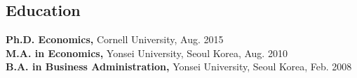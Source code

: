 \documentclass[margin]{res}
\begin{document}
\begin{resume}
\section{Education} 
\textbf{Ph.D. Economics,} Cornell University, Aug. 2015\\
\textbf{M.A. in Economics,} Yonsei University, Seoul Korea,  Aug. 2010\\
\textbf{B.A. in Business Administration,} Yonsei University, Seoul Korea, Feb. 2008
%

\end{resume}
\end{document}
